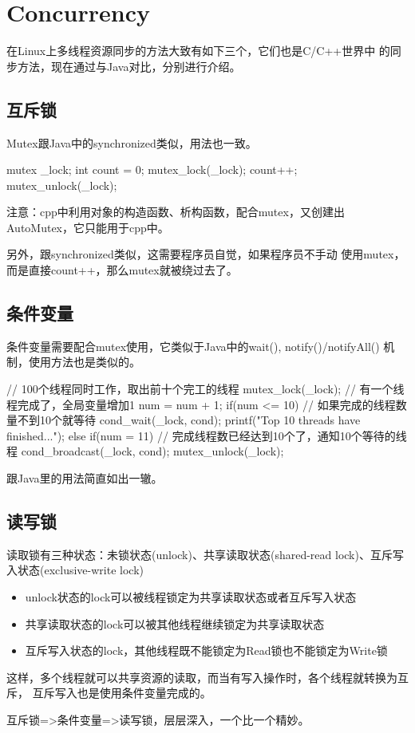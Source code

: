\section[Concurrency]{Concurrency}
在Linux上多线程资源同步的方法大致有如下三个，它们也是C/C++世界中
的同步方法，现在通过与Java对比，分别进行介绍。

\subsection[互斥锁]{互斥锁}
Mutex跟Java中的synchronized类似，用法也一致。

\begin{cppcode}
  mutex _lock;
  int count = 0;
  mutex_lock(_lock);
  count++;
  mutex_unlock(_lock);
\end{cppcode}

注意：cpp中利用对象的构造函数、析构函数，配合mutex，又创建出
AutoMutex，它只能用于cpp中。

另外，跟synchronized类似，这需要程序员自觉，如果程序员不手动
使用mutex，而是直接count++，那么mutex就被绕过去了。

\subsection[条件变量]{条件变量}
条件变量需要配合mutex使用，它类似于Java中的wait(), notify()/notifyAll()
机制，使用方法也是类似的。

\begin{cppcode}
  // 100个线程同时工作，取出前十个完工的线程
  mutex_lock(_lock);
  // 有一个线程完成了，全局变量增加1
  num = num + 1;
  if(num <= 10) {
    // 如果完成的线程数量不到10个就等待
    cond_wait(_lock, cond);
    printf("Top 10 threads have finished...");
  } else if(num = 11) {
    // 完成线程数已经达到10个了，通知10个等待的线程
    cond_broadcast(_lock, cond);
  }
  mutex_unlock(_lock);
\end{cppcode}

跟Java里的用法简直如出一辙。

\subsection[读写锁]{读写锁}
读取锁有三种状态：未锁状态(unlock)、共享读取状态(shared-read lock)、互斥写入状态(exclusive-write lock)

\begin{itemize}
\item unlock状态的lock可以被线程锁定为共享读取状态或者互斥写入状态
\item 共享读取状态的lock可以被其他线程继续锁定为共享读取状态
\item 互斥写入状态的lock，其他线程既不能锁定为Read锁也不能锁定为Write锁
\end{itemize}

这样，多个线程就可以共享资源的读取，而当有写入操作时，各个线程就转换为互斥，
互斥写入也是使用条件变量完成的。

互斥锁=>条件变量=>读写锁，层层深入，一个比一个精妙。